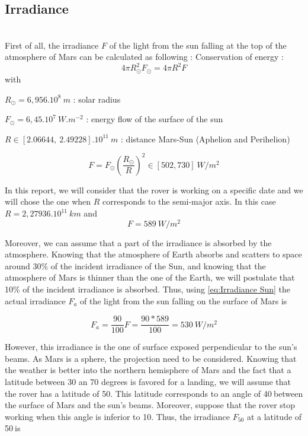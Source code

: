 \subsection{Irradiance}
~\\
First of all, the irradiance $F$ of the light from the sun falling at the top of the atmosphere of Mars can be calculated as following :
Conservation of energy :
\begin{equation}
\label{eq:conservation of energy}
4\pi R_\odot^2F_\odot=4\pi R^2F
\end{equation}
with 

$R_\odot=6,956.10^8\ m$ : solar radius

$F_\odot=6,45.10^7\ W.m^{-2}$ : energy flow of the surface of the sun

$R \in [2.06644,\ 2.49228].10^{11} \ m$ : distance Mars-Sun (Aphelion and Perihelion)

\begin{equation}
\label{eq:Irradiance Sun range}
F = F_\odot \left(\frac{R_\odot}{R}\right)^2 \in [502, 730]\ W/m^2
\end{equation}

In this report, we will consider that the rover is working on a specific date and we will chose the one when $R$ corresponds to the semi-major axis. In this case $R=2,27936.10^{11}\ km$ and
\begin{equation}
\label{eq:Irradiance Sun}
F = 589\ W/m^2
\end{equation}



Moreover, we can assume that a part of the irradiance is absorbed by the atmosphere. Knowing that the atmosphere of Earth absorbs and scatters to space around 30\% of the incident irradiance of the Sun\cite{yamamoto1962direct}, and knowing  that the atmosphere of Mars is thinner than the one of the Earth, we will postulate that 10\% of the incident irradiance is absorbed. Thus, using \eqref{eq:Irradiance Sun} the actual irradiance $F_a$ of the light from the sun falling on the surface of Mars is

\begin{equation}
\label{eq:Actual Irradiance Sun}
F_a = \frac{90}{100}F = \frac{90*589}{100} = 530\ W/m^2
\end{equation}

However, this irradiance is the one of surface exposed perpendicular to the sun's beams. As Mars is a sphere, the projection need to be considered.
Knowing that the weather is better into the northern hemisphere of Mars\cite{wiki:weather} and the fact that a latitude between 30 an 70 degrees is favored for a landing\cite{latitude}, we will assume that the rover has a latitude of 50\textdegree. This latitude corresponds to an angle of 40\textdegree$\ $between the surface of Mars and the sun's beams. Moreover, suppose that the rover stop working when this angle is inferior to 10\textdegree. Thus, the irradiance $F_{50}$ at a latitude of 50\textdegree$\ $is

